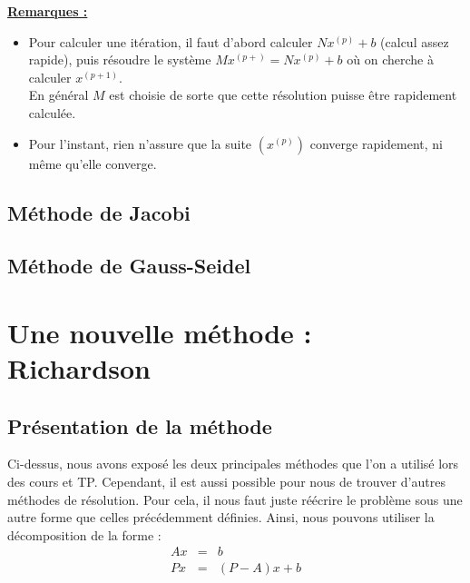 \noindent \textbf{\underline{Remarques :}}
\begin{itemize}
	\item Pour calculer une itération, il faut d'abord calculer $Nx^{(p)} + b$ (calcul assez rapide), puis résoudre le système $Mx^{(p+)} = Nx^{(p)}+b$ où on cherche à calculer $x^{(p+1)}$.\\
	En général $M$ est choisie de sorte que cette résolution puisse être rapidement calculée.
	\item Pour l'instant, rien n'assure que la suite $\left(x^{(p)}\right)$ converge rapidement, ni même qu'elle converge.
\end{itemize}













\subsection{Méthode de Jacobi}
\subsection{Méthode de Gauss-Seidel}
\section{Une nouvelle méthode : Richardson}
\subsection{Présentation de la méthode}
Ci-dessus, nous avons exposé les deux principales méthodes que l'on a utilisé lors des cours et TP. Cependant, il est aussi possible pour nous de trouver d'autres méthodes de résolution. Pour cela, il nous faut juste réécrire le problème sous une autre forme que celles précédemment définies. Ainsi, nous pouvons utiliser la décomposition de la forme :  
\begin{eqnarray}
Ax &=& b\\
Px &=& (P - A)x + b
\end{eqnarray}

